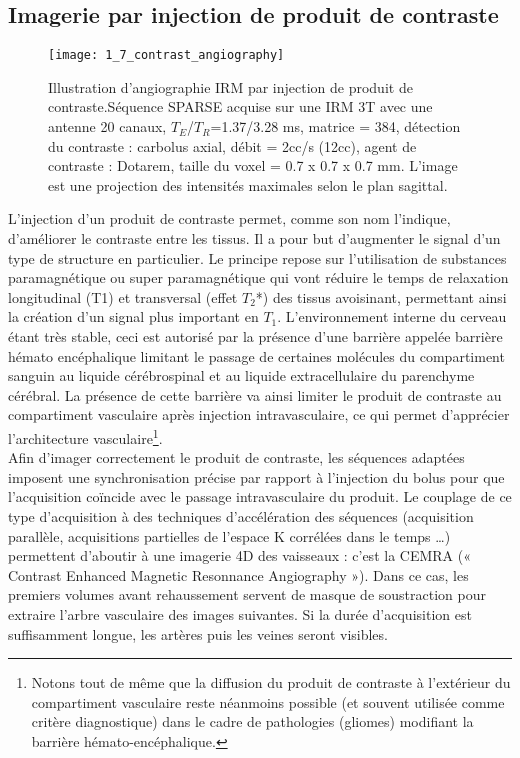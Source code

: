 \subsection{Imagerie par injection de produit de contraste}
\begin{figure}[!t]
\centering
\texttt{[image: 1\_7\_contrast\_angiography]}
\caption{Illustration d'angiographie IRM par injection de produit de contraste.Séquence SPARSE acquise sur une IRM 3T avec une antenne 20 canaux, $T_E$/$T_R$=1.37/3.28 ms, matrice = 384, détection du contraste : carbolus axial, débit = 2cc/s (12cc), agent de contraste : Dotarem, taille du voxel = 0.7 x 0.7 x 0.7 mm. L'image est une projection des intensités maximales selon le plan sagittal. }
\label{fig:1_7_contrast_angiography}	
\end{figure}
L’injection d’un produit de contraste permet, comme son nom l’indique, d’améliorer le contraste entre les tissus. Il a pour but d’augmenter le signal d’un type de structure en particulier. Le principe repose sur l’utilisation de substances paramagnétique ou super paramagnétique qui vont réduire le temps de relaxation longitudinal (T1) et transversal (effet $T_2$*) des tissus avoisinant, permettant ainsi la création d’un signal plus important en $T_1$. L’environnement interne du cerveau étant très stable, ceci est autorisé par la présence d’une barrière appelée barrière hémato encéphalique limitant le passage de certaines molécules du compartiment sanguin au liquide cérébrospinal et au liquide extracellulaire du parenchyme cérébral. La présence de cette barrière va ainsi limiter le produit de contraste au compartiment vasculaire après injection intravasculaire, ce qui permet d’apprécier l’architecture vasculaire\footnote{Notons tout de même que la diffusion du produit de contraste à l’extérieur du compartiment vasculaire reste néanmoins possible (et souvent utilisée comme critère diagnostique) dans le cadre de pathologies (gliomes) modifiant la barrière hémato-encéphalique.}.\\
Afin d’imager correctement le produit de contraste, les séquences adaptées imposent une synchronisation précise par rapport à l’injection du bolus pour que l’acquisition coïncide avec le passage intravasculaire du produit. Le couplage de ce type d’acquisition à des techniques d’accélération des séquences (acquisition parallèle, acquisitions partielles de l’espace K corrélées dans le temps …) permettent d’aboutir à une imagerie 4D des vaisseaux : c’est la CEMRA (« Contrast Enhanced Magnetic Resonnance Angiography »). Dans ce cas, les premiers volumes avant rehaussement servent de masque de soustraction pour extraire l’arbre vasculaire des images suivantes. Si la durée d’acquisition est suffisamment longue, les artères puis les veines seront visibles.\\
